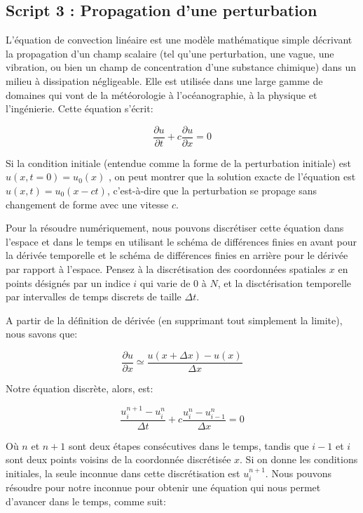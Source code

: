 \documentclass{article}
\begin{document}
\vspace{1cm}

    \subsection{Script 3 : Propagation d'une
perturbation}\label{script-3-propagation-dune-perturbation}

    L'équation de convection linéaire est une modèle mathématique simple
décrivant la propagation d'un champ scalaire (tel qu'une perturbation,
une vague, une vibration, ou bien un champ de concentration d'une
substance chimique) dans un milieu à dissipation négligeable. Elle est
utilisée dans une large gamme de domaines qui vont de la météorologie à
l'océanographie, à la physique et l'ingénierie. Cette équation s'écrit:

\[ \frac{\partial u}{\partial t} + c \frac{ \partial u}{\partial x} = 0\]

Si la condition initiale (entendue comme la forme de la perturbation
initiale) est \(u(x, t=0) = u_0 (x)\) , on peut montrer que la solution
exacte de l'équation est \(u (x, t) = u_0 (x-ct)\), c'est-à-dire que la
perturbation se propage sans changement de forme avec une vitesse \(c\).

Pour la résoudre numériquement, nous pouvons discrétiser cette équation
dans l'espace et dans le temps en utilisant le schéma de différences
finies en avant pour la dérivée temporelle et le schéma de différences
finies en arrière pour le dérivée par rapport à l'espace. Pensez à la
discrétisation des coordonnées spatiales \(x\) en points désignés par un
indice \(i\) qui varie de \(0\) à \(N\), et la disctérisation temporelle
par intervalles de temps discrets de taille \(\Delta t\).

A partir de la définition de dérivée (en supprimant tout simplement la
limite), nous savons que:

\[\frac{\partial u}{\partial x} \simeq \frac{u(x+\Delta x) - u(x)}{\Delta x} \]

Notre équation discrète, alors, est:

\[\frac{u_i^{n+1} - u_i^{n}}{\Delta t} + c \frac{u_i^{n} - u_{i-1}^{n}}{\Delta x} = 0\]

Où \(n\) et \(n + 1\) sont deux étapes consécutives dans le temps,
tandis que \(i-1\) et \(i\) sont deux points voisins de la coordonnée
discrétisée \(x\). Si on donne les conditions initiales, la seule
inconnue dans cette discrétisation est \(u_i^{n+1}\). Nous pouvons
résoudre pour notre inconnue pour obtenir une équation qui nous permet
d'avancer dans le temps, comme suit:
\end{document}
